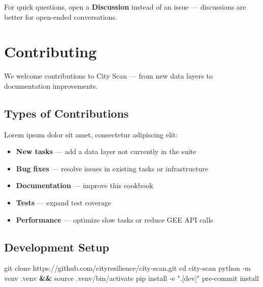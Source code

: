 \documentclass[
  letterpaper,
  DIV=11,
  numbers=noendperiod]{scrreprt}
\newenvironment{Shaded}{\begin{snugshade}}{\end{snugshade}}
\newcommand{\AttributeTok}[1]{\textcolor[rgb]{0.40,0.45,0.13}{#1}}
\newcommand{\BuiltInTok}[1]{\textcolor[rgb]{0.00,0.23,0.31}{#1}}
\newcommand{\ExtensionTok}[1]{\textcolor[rgb]{0.00,0.23,0.31}{#1}}
\newcommand{\FunctionTok}[1]{\textcolor[rgb]{0.28,0.35,0.67}{#1}}
\newcommand{\KeywordTok}[1]{\textcolor[rgb]{0.00,0.23,0.31}{\textbf{#1}}}
\newcommand{\NormalTok}[1]{\textcolor[rgb]{0.00,0.23,0.31}{#1}}
\newcommand{\StringTok}[1]{\textcolor[rgb]{0.13,0.47,0.30}{#1}}
\providecommand{\tightlist}{%
  \setlength{\itemsep}{0pt}\setlength{\parskip}{0pt}}
\begin{document}
\begin{tcolorbox}[enhanced jigsaw, arc=.35mm, bottomrule=.15mm, bottomtitle=1mm, breakable, colback=white, colbacktitle=quarto-callout-tip-color!10!white, colframe=quarto-callout-tip-color-frame, coltitle=black, left=2mm, leftrule=.75mm, opacityback=0, opacitybacktitle=0.6, rightrule=.15mm, title=\textcolor{quarto-callout-tip-color}{\faLightbulb}\hspace{0.5em}{Tip}, titlerule=0mm, toprule=.15mm, toptitle=1mm]

For quick questions, open a \textbf{Discussion} instead of an issue ---
discussions are better for open-ended conversations.

\end{tcolorbox}

\chapter{Contributing}\label{contributing}

We welcome contributions to City Scan --- from new data layers to
documentation improvements.

\section{Types of Contributions}\label{types-of-contributions}

Lorem ipsum dolor sit amet, consectetur adipiscing elit:

\begin{itemize}
\tightlist
\item
  \textbf{New tasks} --- add a data layer not currently in the suite
\item
  \textbf{Bug fixes} --- resolve issues in existing tasks or
  infrastructure
\item
  \textbf{Documentation} --- improve this cookbook
\item
  \textbf{Tests} --- expand test coverage
\item
  \textbf{Performance} --- optimize slow tasks or reduce GEE API calls
\end{itemize}

\section{Development Setup}\label{development-setup}

\begin{Shaded}
\begin{Highlighting}[]
\FunctionTok{git}\NormalTok{ clone https://github.com/cityresilience/city{-}scan.git}
\BuiltInTok{cd}\NormalTok{ city{-}scan}
\ExtensionTok{python} \AttributeTok{{-}m}\NormalTok{ venv .venv }\KeywordTok{\&\&} \BuiltInTok{source}\NormalTok{ .venv/bin/activate}
\ExtensionTok{pip}\NormalTok{ install }\AttributeTok{{-}e} \StringTok{".[dev]"}
\ExtensionTok{pre{-}commit}\NormalTok{ install}
\end{Highlighting}
\end{Shaded}
\end{document}
